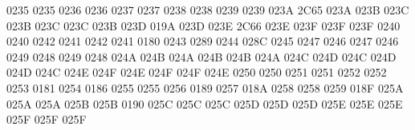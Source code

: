  0235 0235 %
 0236 0236 %
 0237 0237 %
 0238 0238 %
 0239 0239 %
\setcclcuc 023A 2C65 023A %
\setcclcuc 023B 023C 023B %
\setcclcuc 023C 023C 023B %
\setcclcuc 023D 019A 023D %
\setcclcuc 023E 2C66 023E %
\setcclcuc 023F 023F 023F %
 0240 0240 %
 0242 0241 %
 0242 0241 %
 0180 0243 %
 0289 0244 %
 028C 0245 %
 0247 0246 %
 0247 0246 %
 0249 0248 %
 0249 0248 %
\setcclcuc 024A 024B 024A %
\setcclcuc 024B 024B 024A %
\setcclcuc 024C 024D 024C %
\setcclcuc 024D 024D 024C %
\setcclcuc 024E 024F 024E %
\setcclcuc 024F 024F 024E %
 0250 0250 %
 0251 0251 %
 0252 0252 %
 0253 0181 %
 0254 0186 %
 0255 0255 %
 0256 0189 %
 0257 018A %
 0258 0258 %
 0259 018F %
\setcclcuc 025A 025A 025A %
\setcclcuc 025B 025B 0190 %
\setcclcuc 025C 025C 025C %
\setcclcuc 025D 025D 025D %
\setcclcuc 025E 025E 025E %
\setcclcuc 025F 025F 025F %
